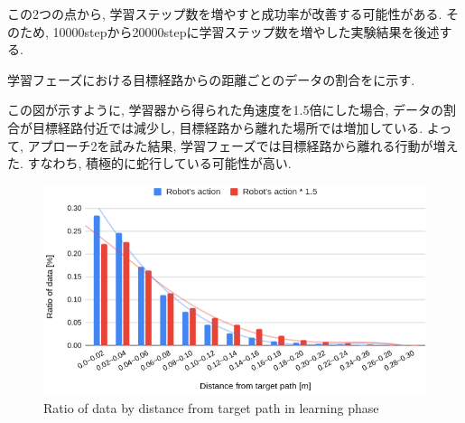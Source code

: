   この2つの点から, 学習ステップ数を増やすと成功率が改善する可能性がある. そのため, 10000stepから20000stepに学習ステップ数を増やした実験結果を後述する.

  \newpage


  学習フェーズにおける目標経路からの距離ごとのデータの割合をに示す. \par
  この図が示すように, 学習器から得られた角速度を1.5倍にした場合, データの割合が目標経路付近では減少し, 目標経路から離れた場所では増加している. よって, アプローチ2を試みた結果, 学習フェーズでは目標経路から離れる行動が増えた. すなわち, 積極的に蛇行している可能性が高い.


  \begin{figure}[hbtp]
    \centering
   \includegraphics[keepaspectratio, scale=0.37]
        {images/hist_act_training2.png}
   \caption{Ratio of data by distance from target path in learning phase}
   \label{Fig:hist_act_training}
  \end{figure}  

